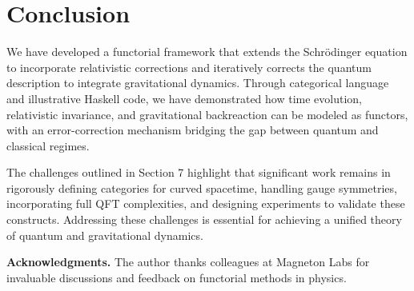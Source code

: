 \documentclass[12pt]{article}
\begin{document}
\section{Conclusion}
We have developed a functorial framework that extends the Schrödinger equation to incorporate relativistic corrections and iteratively corrects the quantum description to integrate gravitational dynamics. Through categorical language and illustrative Haskell code, we have demonstrated how time evolution, relativistic invariance, and gravitational backreaction can be modeled as functors, with an error-correction mechanism bridging the gap between quantum and classical regimes.

The challenges outlined in Section 7 highlight that significant work remains in rigorously defining categories for curved spacetime, handling gauge symmetries, incorporating full QFT complexities, and designing experiments to validate these constructs. Addressing these challenges is essential for achieving a unified theory of quantum and gravitational dynamics.

\vspace{0.5em}
\noindent\textbf{Acknowledgments.} The author thanks colleagues at Magneton Labs for invaluable discussions and feedback on functorial methods in physics.
\end{document}
